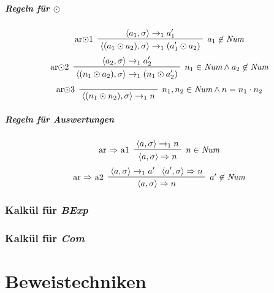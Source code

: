 				\subparagraph{Regeln für $ \odot $}
					\begin{equation*}
						\prftree[l, r]
						{ $ a _ 1 \not\in \textit{Num} $ }
						{ ar$ \odot $1 }
						{ \langle a _ 1, \sigma \rangle \rightarrow _ 1 a _ 1 ' }
						{ \langle (a _ 1 \odot a _ 2), \sigma \rangle \rightarrow _ 1 (a _ 1 ' \odot a _ 2) }
					\end{equation*}
					\begin{equation*}
						\prftree[l, r]
						{ $ n _ 1 \in \textit{Num} \land a _ 2 \not\in \textit{Num} $ }
						{ ar$ \odot $2 }
						{ \langle a _ 2, \sigma \rangle \rightarrow _ 1 a _ 2 ' }
						{ \langle (n _ 1 \odot a _ 2), \sigma \rangle \rightarrow _ 1 (n _ 1 \odot a _ 2 ') }
					\end{equation*}
					\begin{equation*}
						\prftree[l, r]
						{ $ n _ 1, n _ 2 \in \textit{Num} \land n = n _ 1 \cdot n _ 2 $ }
						{ ar$ \odot $3 }
						{ \langle (n _ 1 \odot n _ 2), \sigma \rangle \rightarrow _ 1 n }
					\end{equation*}

				\subparagraph{Regeln für Auswertungen}
					\begin{equation*}
						\prftree[l, r]
						{ $ n \in \textit{Num} $ }
						{ ar $ \Rightarrow $ a1 }
						{ \langle a, \sigma \rangle \rightarrow _ 1 n }
						{ \langle a, \sigma \rangle \Rightarrow n }
					\end{equation*}
					\begin{equation*}
						\prftree[l, r]
						{ $ a' \not\in \textit{Num} $ }
						{ ar $ \Rightarrow $ a2 }
						{ \langle a, \sigma \rangle \rightarrow _ 1 a' }
						{ \langle a', \sigma \rangle \Rightarrow n }
						{ \langle a, \sigma \rangle \Rightarrow n }
					\end{equation*}

			\subsubsection{Kalkül für \textit{BExp}}

			\subsubsection{Kalkül für \textit{Com}}

	\section{Beweistechniken}
